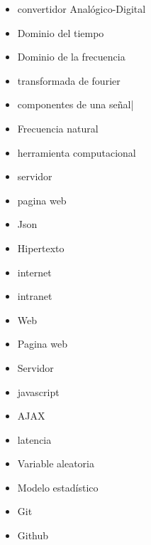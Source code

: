 \begin{itemize}
    \item convertidor Analógico-Digital
    \item Dominio del tiempo
    \item Dominio de la frecuencia
    \item transformada de fourier
    \item componentes de una señal|
    \item Frecuencia natural
    \item herramienta computacional
    \item servidor
    \item pagina web
    \item Json
    \item Hipertexto
    \item internet
    \item intranet
    \item Web
    \item Pagina web
    \item Servidor
    \item javascript
    \item AJAX
    \item latencia
    \item Variable aleatoria
    \item Modelo estadístico
    \item Git
    \item Github
\end{itemize}

